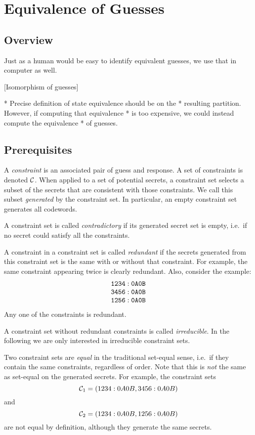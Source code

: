 \chapter{Equivalence of Guesses}

\section{Overview}

Just as a human would be easy to identify equivalent guesses, we use that in computer as well.

[Isomorphism of guesses]

 * Precise definition of state equivalence should be on the
 * resulting partition. However, if computing that equivalence
 * is too expensive, we could instead compute the equivalence
 * of guesses.


\section{Prerequisites}

A \emph{constraint} is an associated pair of guess and response. A set of constraints is denoted $\mathcal{C}$. When applied to a set of potential secrets, a constraint set selects a subset of the secrets that are consistent with those constraints. We call this subset  \emph{generated} by the constraint set. In particular, an empty constraint set generates all codewords.

A constraint set is called \emph{contradictory} if its generated secret set is empty, i.e.\ if no secret could satisfy all the constraints.

A constraint in a constraint set is called \emph{redundant} if the secrets generated from this constraint set is the same with or without that constraint. For example, the same constraint appearing twice is clearly redundant. Also, consider the example:
\[
\begin{array}{c}
\texttt{1234} : \texttt{{0}A{0}B} \\
\texttt{3456} : \texttt{{0}A{0}B} \\
\texttt{1256} : \texttt{{0}A{0}B} 
\end{array}
\]
Any one of the constraints is redundant.

A constraint set without redundant constraints is called \emph{irreducible}. In the following we are only interested in irreducible constraint sets.

Two constraint sets are \emph{equal} in the traditional set-equal sense, i.e.\ if they contain the same constraints, regardless of order. Note that this is \emph{not} the same as set-equal on the generated secrets. For example, the constraint sets
\[
\mathcal{C}_1 = (1234:0A0B, 3456:0A0B)
\]
and
\[
\mathcal{C}_2 = (1234:0A0B, 1256:0A0B)
\]
are not equal by definition, although they generate the same secrets.

